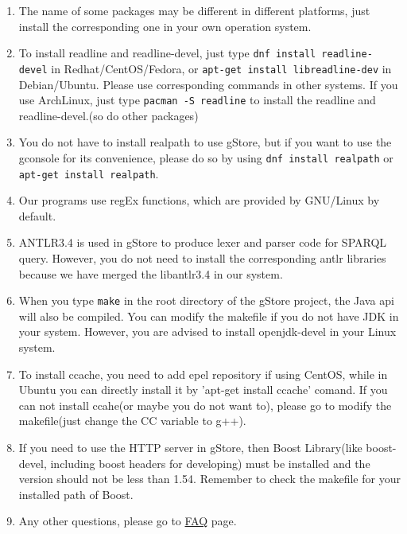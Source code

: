 \documentclass[titlepage, a4paper, 12pt]{article}
\begin{document}
\begin{enumerate}
\item
  The name of some packages may be different in different platforms, just install the corresponding one in your own operation system.
\item
  To install readline and readline-devel, just type \texttt{dnf\ install\ readline-devel} in Redhat/CentOS/Fedora, or \texttt{apt-get\ install\ libreadline-dev} in Debian/Ubuntu. Please use corresponding commands in other systems. If you use ArchLinux, just type \texttt{pacman\ -S\ readline} to install the readline and readline-devel.(so do other packages)
\item
  You do not have to install realpath to use gStore, but if you want to use the gconsole for its convenience, please do so by using \texttt{dnf\ install\ realpath} or \texttt{apt-get\ install\ realpath}.
\item
  Our programs use regEx functions, which are provided by GNU/Linux by default. 
\item
  ANTLR3.4 is used in gStore to produce lexer and parser code for SPARQL query. However, you do not need to install the corresponding antlr libraries because we have merged the libantlr3.4 in our system.
\item
  When you type \texttt{make} in the root directory of the gStore project, the Java api will also be compiled. You can modify the makefile if you do not have JDK in your system. However, you are advised to install openjdk-devel in your Linux system.
\item
  To install ccache, you need to add epel repository if using CentOS, while in Ubuntu you can directly install it by 'apt-get install ccache' comand. If you can not install ccahe(or maybe you do not want to), please go to modify the makefile(just change the CC variable to g++).
\item If you need to use the HTTP server in gStore, then Boost Library(like boost-devel, including boost headers for developing) must be installed and the version should not be less than 1.54. Remember to check the makefile for your installed path of Boost.
\item
  Any other questions, please go to \hyperref[chapter11]{FAQ} page.
\end{enumerate}

\clearpage

\end{document}
